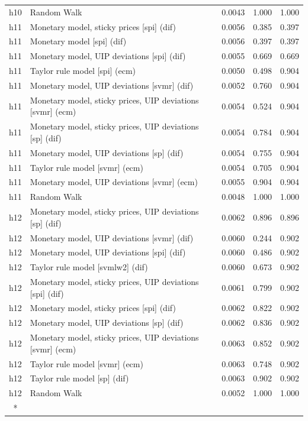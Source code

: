 \begin{ThreePartTable}
\begin{longtable}[t]{cp{5.5cm}ccc}
h10 & \raggedright Random Walk & 0.0043 & 1.000 & 1.000\\
\addlinespace
h11 & \raggedright Monetary model, sticky prices [spi] (dif) & 0.0056 & 0.385 & 0.397\\
h11 & \raggedright Monetary model [spi] (dif) & 0.0056 & 0.397 & 0.397\\
h11 & \raggedright Monetary model, UIP deviations [spi] (dif) & 0.0055 & 0.669 & 0.669\\
h11 & \raggedright Taylor rule model [spi] (ecm) & 0.0050 & 0.498 & 0.904\\
h11 & \raggedright Monetary model, UIP deviations [svmr] (dif) & 0.0052 & 0.760 & 0.904\\
h11 & \raggedright Monetary model, sticky prices, UIP deviations [svmr] (ecm) & 0.0054 & 0.524 & 0.904\\
h11 & \raggedright Monetary model, sticky prices, UIP deviations [sp] (dif) & 0.0054 & 0.784 & 0.904\\
h11 & \raggedright Monetary model, UIP deviations [sp] (dif) & 0.0054 & 0.755 & 0.904\\
h11 & \raggedright Taylor rule model [svmr] (ecm) & 0.0054 & 0.705 & 0.904\\
h11 & \raggedright Monetary model, UIP deviations [svmr] (ecm) & 0.0055 & 0.904 & 0.904\\
h11 & \raggedright Random Walk & 0.0048 & 1.000 & 1.000\\
\addlinespace
h12 & \raggedright Monetary model, sticky prices, UIP deviations [sp] (dif) & 0.0062 & 0.896 & 0.896\\
h12 & \raggedright Monetary model, UIP deviations [svmr] (dif) & 0.0060 & 0.244 & 0.902\\
h12 & \raggedright Monetary model, UIP deviations [spi] (dif) & 0.0060 & 0.486 & 0.902\\
h12 & \raggedright Taylor rule model [svmlw2] (dif) & 0.0060 & 0.673 & 0.902\\
h12 & \raggedright Monetary model, sticky prices, UIP deviations [spi] (dif) & 0.0061 & 0.799 & 0.902\\
h12 & \raggedright Monetary model, sticky prices [spi] (dif) & 0.0062 & 0.822 & 0.902\\
h12 & \raggedright Monetary model, UIP deviations [sp] (dif) & 0.0062 & 0.836 & 0.902\\
h12 & \raggedright Monetary model, sticky prices, UIP deviations [svmr] (ecm) & 0.0063 & 0.852 & 0.902\\
h12 & \raggedright Taylor rule model [svmr] (ecm) & 0.0063 & 0.748 & 0.902\\
h12 & \raggedright Taylor rule model [sp] (dif) & 0.0063 & 0.902 & 0.902\\
h12 & \raggedright Random Walk & 0.0052 & 1.000 & 1.000\\*
\end{longtable}
\end{ThreePartTable}
\endgroup{}
